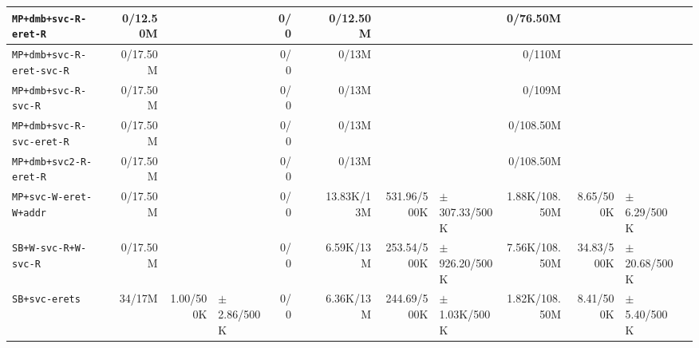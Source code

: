 \begin{tabular}{l  | r r l | r r l | r r l | r r l l}
       \verb|MP+dmb+svc-R-eret-R| &       0/12.50M &                       &                 &            0/0 &                       &  &       0/12.50M &                       &                   &       0/76.50M &                       &                  & \\ \hline 
   \verb|MP+dmb+svc-R-eret-svc-R| &       0/17.50M &                       &                 &            0/0 &                       &  &          0/13M &                       &                   &         0/110M &                       &                  & \\ \hline 
        \verb|MP+dmb+svc-R-svc-R| &       0/17.50M &                       &                 &            0/0 &                       &  &          0/13M &                       &                   &         0/109M &                       &                  & \\ \hline 
   \verb|MP+dmb+svc-R-svc-eret-R| &       0/17.50M &                       &                 &            0/0 &                       &  &          0/13M &                       &                   &      0/108.50M &                       &                  & \\ \hline 
      \verb|MP+dmb+svc2-R-eret-R| &       0/17.50M &                       &                 &            0/0 &                       &  &          0/13M &                       &                   &      0/108.50M &                       &                  & \\ \hline 
      \verb|MP+svc-W-eret-W+addr| &       0/17.50M &                       &                 &            0/0 &                       &  &     13.83K/13M &           531.96/500K & $\pm$ 307.33/500K &  1.88K/108.50M &             8.65/500K &  $\pm$ 6.29/500K & \\ \hline 
        \verb|SB+W-svc-R+W-svc-R| &       0/17.50M &                       &                 &            0/0 &                       &  &      6.59K/13M &           253.54/500K & $\pm$ 926.20/500K &  7.56K/108.50M &            34.83/500K & $\pm$ 20.68/500K & \\ \hline 
              \verb|SB+svc-erets| &         34/17M &             1.00/500K & $\pm$ 2.86/500K &            0/0 &                       &  &      6.36K/13M &           244.69/500K &  $\pm$ 1.03K/500K &  1.82K/108.50M &             8.41/500K &  $\pm$ 5.40/500K & \\ \hline 
\end{tabular}
